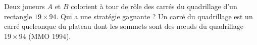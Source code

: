 Deux joueurs $A$ et $B$ colorient à tour de rôle des carrés du quadrillage d'un rectangle $19 \times 94$. Qui a une stratégie gagnante ? Un carré du quadrillage est un carré quelconque du plateau dont les sommets sont des nœuds du quadrillage $19 \times 94$ (MMO 1994).
